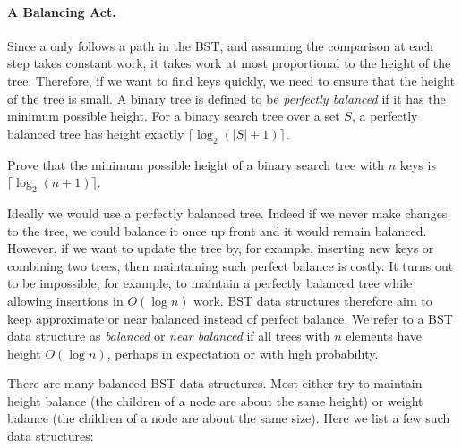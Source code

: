 \paragraph{A Balancing Act.}
Since a  only follows a path in the BST, and assuming the
comparison at each step takes constant work, it takes work at most
proportional to the height of the tree.  Therefore, if we want to find
keys quickly, we need to ensure that the height of the tree is small.
A binary tree is defined to be \emph{perfectly balanced} if it has the
minimum possible height.  For a binary search tree over a set $S$, a
perfectly balanced tree has height exactly $\lceil \log_2 (|S| + 1) \rceil$.
\begin{exercise}
Prove that the minimum possible height of a binary search tree
with $n$ keys is $\lceil \log_2 (n + 1)\rceil$.
\end{exercise}
Ideally we would use a perfectly balanced tree.  Indeed if we never
make changes to the tree, we could balance it once up front and it
would remain balanced.  However, if we want to update the tree by, for
example, inserting new keys or combining two trees, then maintaining
such perfect balance is costly.  It turns out to be impossible, for
example, to maintain a perfectly balanced tree while allowing
insertions in $O(\log n)$ work.  BST data structures therefore aim to
keep approximate or near balanced instead of perfect balance.  We
refer to a BST data structure as {\em balanced} or {\em near balanced}
if all trees with $n$ elements have height $O(\log n)$, perhaps in
expectation or with high probability.

There are many balanced BST data structures.  Most either try to
maintain height balance (the children of a node are about the same
height) or weight balance (the children of a node are about the same
size).  Here we list a few such data structures:

